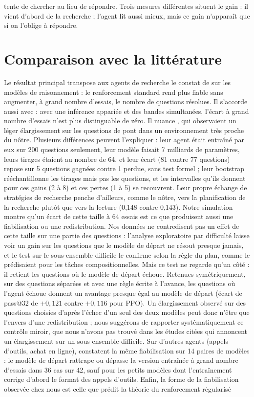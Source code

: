tente de chercher au lieu de répondre. Trois mesures différentes situent le gain : il vient d'abord de la recherche ; l'agent lit aussi mieux, mais ce gain n'apparaît que si on l'oblige à répondre.

\section{Comparaison avec la littérature}\label{sec:discussion-generale}
Le résultat principal transpose aux agents de recherche le constat de \citet{yue2025does} sur les modèles de raisonnement : le renforcement standard rend plus fiable sans augmenter, à grand nombre d'essais, le nombre de questions résolues. Il s'accorde aussi avec \citet{yang2026crossovers} : avec une inférence appariée et des bandes simultanées, l'écart à grand nombre d'essais n'est plus distinguable de zéro. Il nuance \citet{zhai2026does}, qui observaient un léger élargissement sur les questions de pont dans un environnement très proche du nôtre. Plusieurs différences peuvent l'expliquer : leur agent était entraîné par eux sur 200 questions seulement, leur modèle faisait 7 milliards de paramètres, leurs tirages étaient au nombre de 64, et leur écart (81 contre 77 questions) repose sur 5 questions gagnées contre 1 perdue, sans test formel ; leur bootstrap rééchantillonne les tirages mais pas les questions, et les intervalles qu'ils donnent pour ces gains (2 à 8) et ces pertes (1 à 5) se recouvrent. Leur propre échange de stratégies de recherche penche d'ailleurs, comme le nôtre, vers la planification de la recherche plutôt que vers la lecture (0,148 contre 0,143). Notre simulation montre qu'un écart de cette taille à 64 essais est ce que produisent aussi une fiabilisation ou une redistribution. Nos données ne contredisent pas un effet de cette taille sur une partie des questions : l'analyse exploratoire par difficulté laisse voir un gain sur les questions que le modèle de départ ne résout presque jamais, et le test sur le sous-ensemble difficile le confirme selon la règle du plan, comme le prédisaient \citet{zhai2026does} pour les tâches compositionnelles. Mais ce test ne regarde qu'un côté : il retient les questions où le modèle de départ échoue. Retenues symétriquement, sur des questions séparées et avec une règle écrite à l'avance, les questions où l'agent échoue donnent un avantage presque égal au modèle de départ (écart de pass@32 de $+0{,}121$ contre $+0{,}116$ pour PPO). Un élargissement observé sur des questions choisies d'après l'échec d'un seul des deux modèles peut donc n'être que l'envers d'une redistribution ; nous suggérons de rapporter systématiquement ce contrôle miroir, que nous n'avons pas trouvé dans les études citées qui annoncent un élargissement sur un sous-ensemble difficile. Sur d'autres agents (appels d'outils, achat en ligne), \citet{oh2026sharpening} constatent la même fiabilisation sur 14 paires de modèles : le modèle de départ rattrape ou dépasse la version entraînée à grand nombre d'essais dans 36 cas sur 42, sauf pour les petits modèles dont l'entraînement corrige d'abord le format des appels d'outils. Enfin, la forme de la fiabilisation observée chez nous est celle que prédit la théorie du renforcement régularisé 